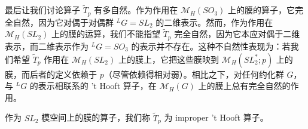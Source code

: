 
最后让我们讨论算子 $\widetilde{T}_p$ 有多自然。作为作用在 $\mathcal{M}_H(SO_3)$ 上的膜的算子，它完全自然，因为它对偶于对偶群 ${}^{L}G=SL_2$ 的二维表示。然而，作为作用在 $\mathcal{M}_H(SL_2)$ 上的膜的运算，我们不能指望 $\widetilde{T}_p$ 完全自然，因为它本应对偶于二维表示，而二维表示作为 ${}^{L}G=SO_3$ 的表示并不存在。这种不自然性表现为：若我们希望 $\widetilde{T}_p$ 作用在 $\mathcal{M}_H(SL_2)$ 上的膜上，它把这些膜映到 $\mathcal{M}_H(SL_2^*;p)$ 上的膜，而后者的定义依赖于 $p$（尽管依赖得相对弱）。相比之下，对任何约化群 $G$，与 ${}^{L}G$ 的表示相联系的 't Hooft
算子，在 $\mathcal{M}_H(G)$ 上的膜上总有完全自然的作用。

作为 $SL_2$ 模空间上的膜的算子，我们称 $\widetilde{T}_p$ 为 improper 't Hooft 算子。
